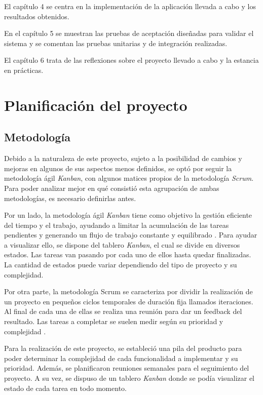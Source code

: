 \documentclass[pdftex,11pt,a4paper]{book}
\begin{document}
El capítulo 4 se centra en la implementación de la aplicación llevada a cabo y los resultados obtenidos.

En el capítulo 5 se muestran las pruebas de aceptación diseñadas para validar el sistema y se comentan las pruebas unitarias y de integración realizadas. 

El capítulo 6 trata de las reflexiones sobre el proyecto llevado a cabo y la estancia en prácticas.



\chapter{Planificación del proyecto} \label{capitulo:planificacion}

\section{Metodología} \label{seccion:metodologia}

Debido a la naturaleza de este proyecto, sujeto a la posibilidad de cambios y mejoras en algunos de sus aspectos menos definidos, se optó por seguir la metodología ágil \textit{Kanban}, con algunos matices propios de la metodología \textit{Scrum}. Para poder analizar mejor en qué consistió esta agrupación de ambas metodologías, es necesario definirlas antes.

Por un lado, la metodología ágil \textit{Kanban} tiene como objetivo la gestión eficiente del tiempo y el trabajo, ayudando a limitar la acumulación de las tareas pendientes y generando un flujo de trabajo constante y equilibrado \cite{bib:kanban}. Para ayudar a visualizar ello, se dispone del tablero \textit{Kanban}, el cual se divide en diversos estados. Las tareas van pasando por cada uno de ellos hasta quedar finalizadas. La cantidad de estados puede variar dependiendo del tipo de proyecto y su complejidad.

Por otra parte, la metodología Scrum se caracteriza por dividir la realización de un proyecto en pequeños ciclos temporales de duración fija llamados iteraciones. Al final de cada una de ellas se realiza una reunión para dar un feedback del resultado. Las tareas a completar se suelen medir según su prioridad y complejidad \cite{bib:scrum}.

Para la realización de este proyecto, se estableció una pila del producto para poder determinar la complejidad de cada funcionalidad a implementar y su prioridad. Además, se planificaron reuniones semanales para el seguimiento del proyecto. A su vez, se dispuso de un tablero \textit{Kanban} donde se podía visualizar el estado de cada tarea en todo momento.
\end{document}

